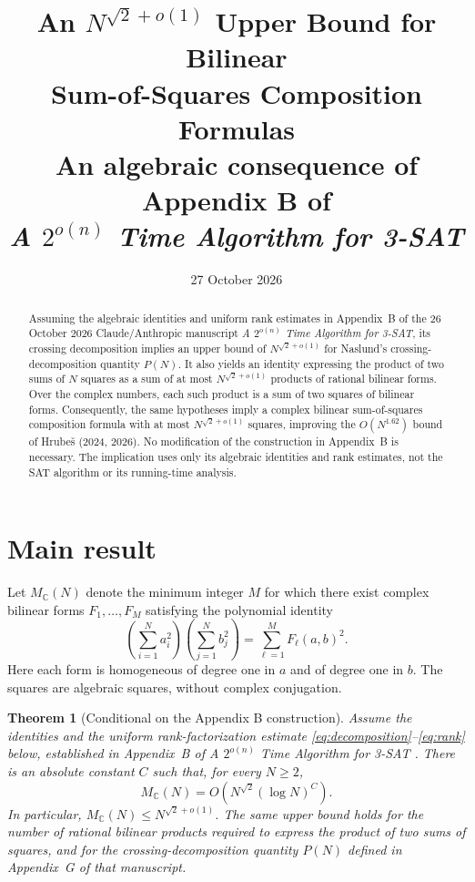 \documentclass[11pt,a4paper]{article}
\title{\textbf{An \(N^{\sqrt{2}+o(1)}\) Upper Bound for Bilinear\\
Sum-of-Squares Composition Formulas}\\[0.7em]
\large An algebraic consequence of Appendix B of\\
\emph{A \(2^{o(n)}\) Time Algorithm for 3-SAT}}
\author{}
\date{27 October 2026}
\newtheorem{theorem}{Theorem}
\newcommand{\CC}{\mathbb C}
\begin{document}
\maketitle

\begin{abstract}
Assuming the algebraic identities and uniform rank estimates in Appendix~B
of the 26 October 2026 Claude/Anthropic manuscript \emph{A \(2^{o(n)}\)
Time Algorithm for 3-SAT}, its crossing decomposition implies an upper
bound of \(N^{\sqrt{2}+o(1)}\) for Naslund's crossing-decomposition quantity
\(P(N)\). It also yields an identity expressing the product of two sums of
\(N\) squares as a sum of at most \(N^{\sqrt{2}+o(1)}\) products of rational
bilinear forms. Over the complex numbers, each such product is a sum of
two squares of bilinear forms. Consequently, the same hypotheses imply a
complex bilinear sum-of-squares composition formula with at most
\(N^{\sqrt{2}+o(1)}\) squares, improving the \(O(N^{1.62})\) bound of
Hrube\v{s} (2024, 2026). No modification of the construction in Appendix~B
is necessary. The implication uses only its algebraic identities and rank
estimates, not the SAT algorithm or its running-time analysis.
\end{abstract}

\section{Main result}

Let \(M_{\CC}(N)\) denote the minimum integer \(M\) for which there exist
complex bilinear forms \(F_1,\ldots,F_M\) satisfying the polynomial identity
\[
  \left(\sum_{i=1}^{N}a_i^2\right)
  \left(\sum_{j=1}^{N}b_j^2\right)
  =\sum_{\ell=1}^{M}F_\ell(a,b)^2.
\]
Here each form is homogeneous of degree one in \(a\) and of degree one in
\(b\). The squares are algebraic squares, without complex conjugation.

\begin{theorem}[Conditional on the Appendix B construction]
\label{thm:main}
Assume the identities and the uniform rank-factorization estimate
\eqref{eq:decomposition}--\eqref{eq:rank} below, established in
Appendix~B of \emph{A \(2^{o(n)}\) Time Algorithm for 3-SAT}
\cite{claude}. There is an absolute constant \(C\) such that, for every
\(N\geq 2\),
\[
  M_{\CC}(N)=O\!\left(N^{\sqrt{2}}(\log N)^C\right).
\]
In particular, \(M_{\CC}(N)\leq N^{\sqrt{2}+o(1)}\).
The same upper bound holds for the number of rational bilinear products
required to express the product of two sums of squares, and for the
crossing-decomposition quantity \(P(N)\) defined in Appendix~G of that
manuscript.
\end{theorem}
\end{document}

